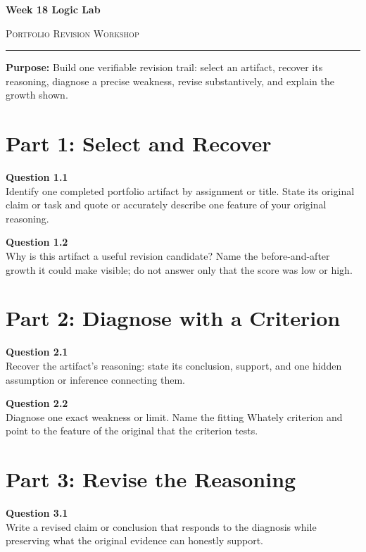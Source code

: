 \documentclass[12pt]{article}
\begin{document}
\begin{center}
{\LARGE\bfseries Week 18 Logic Lab}\par\vspace{0.05em}
{\large\scshape Portfolio Revision Workshop}\par\vspace{0.1em}
\rule{0.78\textwidth}{0.5pt}\par\vspace{0.15em}
\end{center}
\noindent\textbf{Purpose:} Build one verifiable revision trail: select an artifact, recover its reasoning, diagnose a precise weakness, revise substantively, and explain the growth shown.
\vspace{0.3em}

\section*{Part 1: Select and Recover}
\textbf{Question 1.1}\\[-0.15em]
Identify one completed portfolio artifact by assignment or title. State its original claim or task and quote or accurately describe one feature of your original reasoning.

\textbf{Question 1.2}\\[-0.15em]
Why is this artifact a useful revision candidate? Name the before-and-after growth it could make visible; do not answer only that the score was low or high.

\newpage
\section*{Part 2: Diagnose with a Criterion}
\textbf{Question 2.1}\\[-0.15em]
Recover the artifact's reasoning: state its conclusion, support, and one hidden assumption or inference connecting them.

\textbf{Question 2.2}\\[-0.15em]
Diagnose one exact weakness or limit. Name the fitting Whately criterion and point to the feature of the original that the criterion tests.

\newpage
\section*{Part 3: Revise the Reasoning}
\textbf{Question 3.1}\\[-0.15em]
Write a revised claim or conclusion that responds to the diagnosis while preserving what the original evidence can honestly support.
\end{document}
